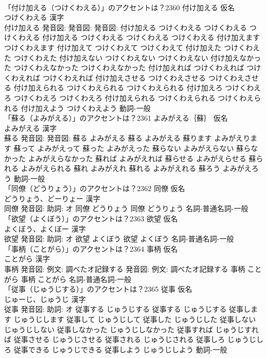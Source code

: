 \documentclass[8pt]{extreport}
\begin{document}
\begin{CJK}{UTF8}{min}
\\	「付け加える（つけくわえる）」のアクセントは？2360	付け加える 仮名　
\\	つけくわえる 漢字　
\\	付け加える 発音図: 発音図: 発音図:	付け加える つけくわえる つけくわえる つけくわえる		付け加える つけくわえる つけくわえる つけくわえる 付け加えます つけくわえます 付け加えて つけくわえて つけくわえて 付け加えた つけくわえた つけくわえた 付け加えない つけくわえない つけくわえない 付け加えなかった つけくわえなかった つけくわえなかった 付け加えれば つけくわえれば つけくわえれば つけくわえれば 付け加えさせる つけくわえさせる つけくわえさせる 付け加えられる つけくわえられる つけくわえられる 付け加えろ つけくわえろ つけくわえろ つけくわえろ 付け加えられる つけくわえられる つけくわえられる 付け加えよう つけくわえよう				動詞-一般 
\\	「蘇る（よみがえる）」のアクセントは？2361	よみがえる｛蘇｝ 仮名　
\\	よみがえる 漢字　
\\	蘇る 発音図: 発音図:	蘇る よみがえる		蘇る よみがえる 蘇ります よみがえります 蘇って よみがえって 蘇った よみがえった 蘇らない よみがえらない 蘇らなかった よみがえらなかった 蘇れば よみがえれば 蘇らせる よみがえらせる 蘇られる よみがえられる 蘇れ よみがえれ 蘇れる よみがえれる 蘇ろう よみがえろう				動詞-一般 
\\	「同僚（どうりょう）」のアクセントは？2362	同僚 仮名　
\\	どうりょう、どーりょー 漢字　
\\	同僚 発音図: 助詞: オ	同僚 どうりょう		同僚 どうりょう				名詞-普通名詞-一般 
\\	「欲望（よくぼう）」のアクセントは？2363	欲望 仮名　
\\	よくぼう、よくぼー 漢字　
\\	欲望 発音図: 助詞: オ	欲望 よくぼう		欲望 よくぼう				名詞-普通名詞-一般 
\\	「事柄（ことがら）」のアクセントは？2364	事柄 仮名　
\\	ことがら 漢字　
\\	事柄 発音図: 例文: 調べたオ記録する 発音図: 例文: 調べたオ記録する	事柄 ことがら		事柄 ことがら				名詞-普通名詞-一般 
\\	「従事（じゅうじする）」のアクセントは？2365	従事 仮名　
\\	じゅーじ、じゅうじ 漢字　
\\	従事 発音図: 助詞: オ	従事する じゅうじする		従事する じゅうじする 従事します じゅうじします 従事して じゅうじして 従事した じゅうじした 従事しない じゅうじしない 従事しなかった じゅうじしなかった 従事すれば じゅうじすれば 従事させる じゅうじさせる 従事される じゅうじされる 従事しろ じゅうじしろ 従事できる じゅうじできる 従事しよう じゅうじしよう				動詞-一般 

\end{CJK}
\end{document}
